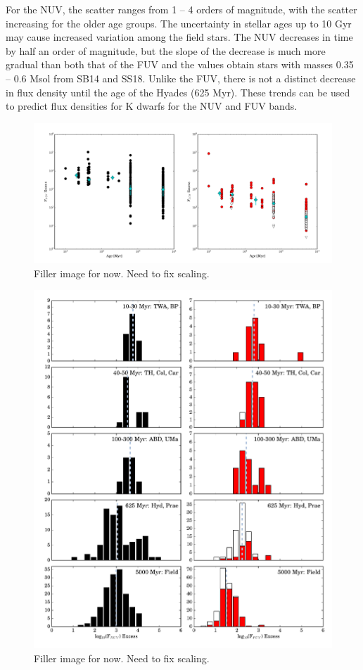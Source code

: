 \documentclass[twocolumn]{aastex62}
\begin{document}
For the NUV, the scatter ranges from 1 – 4 orders of magnitude, with the scatter increasing for the older age groups. The uncertainty in stellar ages up to 10 Gyr may cause increased variation among the field stars. The NUV decreases in time by half an order of magnitude, but the slope of the decrease is much more gradual than both that of the FUV and the values obtain stars with masses 0.35 – 0.6 Msol from SB14 and SS18. Unlike the FUV, there is not a distinct decrease in flux density until the age of the Hyades (625 Myr). These trends can be used to predict flux densities for K dwarfs for the NUV and FUV bands. 


\begin{figure}[h]
\includegraphics[width=\linewidth]{ffdensity_age_NO_J.pdf}
\caption{Filler image for now. Need to fix scaling. \label{fig:ffdensity_age}}
\end{figure}

\begin{figure}[h]
\includegraphics[width=\linewidth]{histfd_NO_J.pdf}
\caption{Filler image for now. Need to fix scaling. \label{fig:histfd}}
\end{figure}
\end{document}
